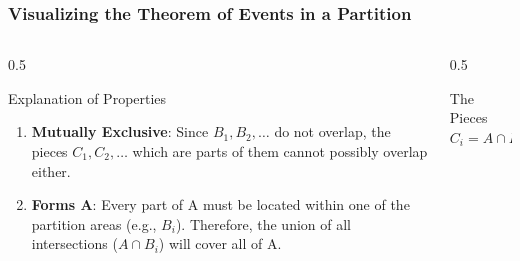 \begin{frame}
    \frametitle{Visualizing the Theorem of Events in a Partition}
    
    \begin{columns}[T]
        \begin{column}{0.5\textwidth}
            \begin{block}{Explanation of Properties}
                \begin{enumerate}
                    \item \textbf{Mutually Exclusive}: Since \(B_1, B_2, \dots\) do not overlap, the pieces \(C_1, C_2, \dots\) which are parts of them cannot possibly overlap either.
                    \item \textbf{Forms A}: Every part of A must be located within one of the partition areas (e.g., \(B_i\)). Therefore, the union of all intersections (\(A \cap B_i\)) will cover all of A.
                \end{enumerate}
            \end{block}
        \end{column}
        
        \begin{column}{0.5\textwidth}
            \begin{block}{The Pieces \(C_i = A \cap B_i\)}
                \centering
\end{block}
\end{column}
\end{columns}
\end{frame}
